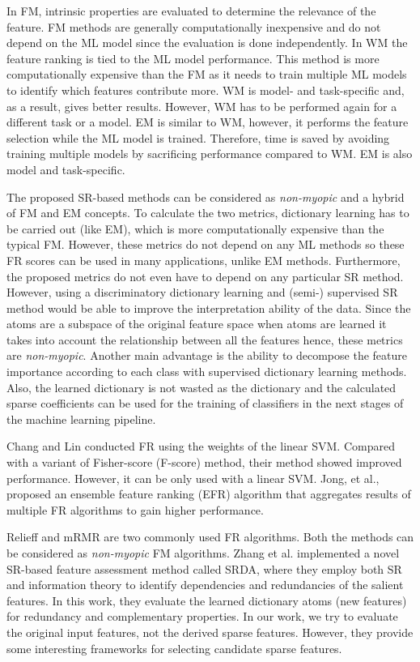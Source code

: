 In FM, intrinsic properties are evaluated to determine the relevance of the feature. FM methods are generally computationally inexpensive and do not depend on the ML model since the evaluation is done independently. In WM the feature ranking is tied to the ML model performance. This method is more computationally expensive than the FM as it needs to train multiple ML models to identify which features contribute more. WM is model- and task-specific and, as a result, gives better results. However, WM has to be performed again for a different task or a model. EM is similar to WM, however, it performs the feature selection while the ML model is trained. Therefore, time is saved by avoiding training multiple models by sacrificing performance compared to WM\@. EM is also model and task-specific.  

The proposed SR-based methods can be considered as \textit{non-myopic} and a hybrid of FM and EM concepts. To calculate the two metrics, dictionary learning has to be carried out (like EM), which is more computationally expensive than the typical FM\@. However, these metrics do not depend on any ML methods so these FR scores can be used in many applications, unlike EM methods. Furthermore, the proposed metrics do not even have to depend on any particular SR method. However, using a discriminatory dictionary learning and (semi-) supervised SR method would be able to improve the interpretation ability of the data. Since the atoms are a subspace of the original feature space when atoms are learned it takes into account the relationship between all the features hence, these metrics are \textit{non-myopic}. Another main advantage is the ability to decompose the feature importance according to each class with supervised dictionary learning methods. Also, the learned dictionary is not wasted as the dictionary and the calculated sparse coefficients can be used for the training of classifiers in the next stages of the machine learning pipeline. 

Chang and Lin\cite{Chang2008} conducted FR using the weights of the linear SVM\@. Compared with a variant of Fisher-score\cite{Chang2011} (F-score) method, their method showed improved performance. However, it can be only used with a linear SVM\@. Jong, et al.\cite{Jong2004}, proposed an ensemble feature ranking (EFR) algorithm that aggregates results of multiple FR algorithms to gain higher performance. 

Relieff\cite{Kononenko1997} and mRMR\cite{Ding2005} are two commonly used FR algorithms. Both the methods can be considered as \textit{non-myopic} FM algorithms. Zhang et al.\cite{Zhang2019} implemented a novel SR-based feature assessment method called SRDA, where they employ both SR and information theory to identify dependencies and redundancies of the salient features. In this work, they evaluate the learned dictionary atoms (new features) for redundancy and complementary properties. In our work, we try to evaluate the original input features, not the derived sparse features. However, they provide some interesting frameworks for selecting candidate sparse features.

